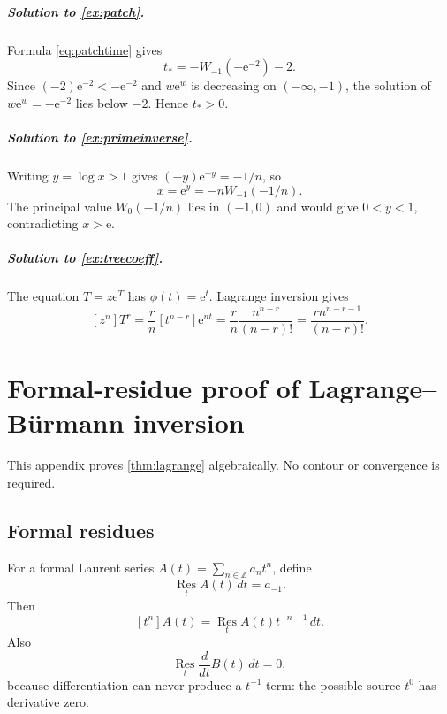 \documentclass[11pt,oneside]{book}
\theoremstyle{definition}
\theoremstyle{remark}
\newcommand{\ee}{\mathrm e}
\newcommand{\Z}{\mathbb Z}
\newcommand{\Res}{\operatorname*{Res}}
\begin{document}
\paragraph{Solution to \cref{ex:patch}.}
Formula \eqref{eq:patchtime} gives
\[
 t_*=-W_{-1}(-\ee^{-2})-2.
\]
Since $(-2)\ee^{-2}<-\ee^{-2}$ and $w\ee^w$ is decreasing on
$(-\infty,-1)$, the solution of $w\ee^w=-\ee^{-2}$ lies below $-2$.
Hence $t_*>0$.

\paragraph{Solution to \cref{ex:primeinverse}.}
Writing $y=\log x>1$ gives
$(-y)\ee^{-y}=-1/n$, so
\[
 x=\ee^y=-nW_{-1}(-1/n).
\]
The principal value $W_0(-1/n)$ lies in $(-1,0)$ and would give
$0<y<1$, contradicting $x>\ee$.

\paragraph{Solution to \cref{ex:treecoeff}.}
The equation $T=z\ee^T$ has $\phi(t)=\ee^t$.  Lagrange inversion gives
\[
 [z^n]T^r
 =\frac rn[t^{n-r}]\ee^{nt}
 =\frac rn\frac{n^{n-r}}{(n-r)!}
 =\frac{r n^{n-r-1}}{(n-r)!}.
\]


\appendix

\chapter{Formal-residue proof of Lagrange--Bürmann inversion}
\label{app:lagrange}

This appendix proves \cref{thm:lagrange} algebraically.  No contour or
convergence is required.

\section{Formal residues}

For a formal Laurent series $A(t)=\sum_{n\in\Z}a_nt^n$, define
\[
 \Res_t A(t)\,dt=a_{-1}.
\]
Then
\begin{equation}\label{eq:formalcoefficientresidue}
 [t^n]A(t)=\Res_t A(t)t^{-n-1}\,dt.
\end{equation}
Also
\begin{equation}\label{eq:residuederivativezero}
 \Res_t \frac{d}{dt}B(t)\,dt=0,
\end{equation}
because differentiation can never produce a $t^{-1}$ term: the possible
source $t^0$ has derivative zero.
\end{document}
